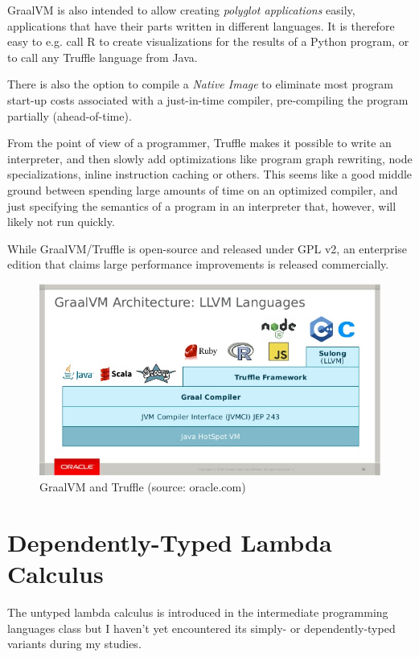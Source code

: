 \documentclass[english,zadani,odsaz]{fitthesis}
\begin{document}
GraalVM is also intended to allow creating \emph{polyglot applications} easily,
applications that have their parts written in different languages. It is
therefore easy to e.g. call R to create visualizations for the results of a
Python program, or to call any Truffle language from Java.

There is also the option to compile a \emph{Native Image} to eliminate most program
start-up costs associated with a just-in-time compiler, pre-compiling the
program partially (ahead-of-time).

From the point of view of a programmer, Truffle makes it possible to write an
interpreter, and then slowly add optimizations like program graph rewriting,
node specializations, inline instruction caching or others. This seems like a
good middle ground between spending large amounts of time on an optimized
compiler, and just specifying the semantics of a program in an interpreter that,
however, will likely not run quickly.

While GraalVM/Truffle is open-source and released under GPL v2, an
enterprise edition that claims large performance improvements is released
commercially.

\begin{figure}[!htb]
\centering
\includegraphics[width=.9\linewidth]{./img/graalvm.jpg}
\caption{GraalVM and Truffle (source: oracle.com)}
\end{figure}

\chapter{Dependently-Typed Lambda Calculus}
\label{sec:orge053f1d}
The untyped lambda calculus is introduced in the intermediate programming
languages class but I haven't yet encountered its simply- or dependently-typed
variants during my studies.
\end{document}
